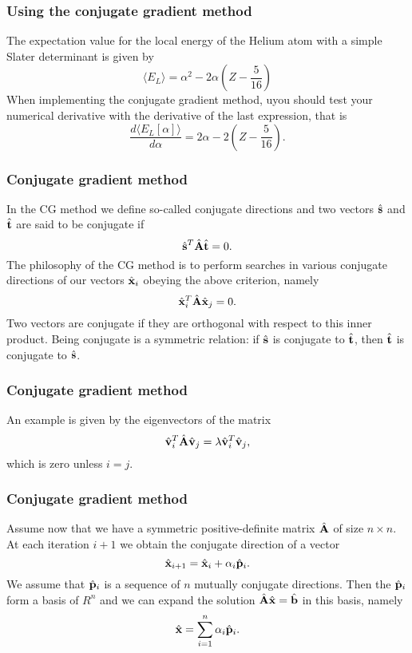 \documentclass[compress]{beamer}
\begin{document}
\frame
{
  \frametitle{Using the conjugate gradient method}
\begin{small}
{\scriptsize
The expectation value for the local energy of the Helium atom with a simple Slater determinant is given by
\[
\langle E_{L} \rangle = \alpha^2-2\alpha\left(Z-\frac{5}{16}\right)
\]
When implementing the conjugate gradient method, uyou should test your numerical derivative with the derivative of the last expression, that is
\[
\frac{d\langle E_{L}[\alpha] \rangle}{d\alpha} = 2\alpha-2\left(Z-\frac{5}{16}\right).
\]
}
\end{small}
}

\frame
{
  \frametitle{Conjugate gradient method}
\begin{small}
{\scriptsize
In the CG method we define so-called conjugate directions and two vectors 
$\hat{\bf {s}}$ and $\hat{\bf {t}}$
are said to be
conjugate if 
\[
\hat{\bf {s}}^T\hat{{\bf A}}\hat{\bf {t}}= 0.
\]
The philosophy of the CG method is to perform searches in various conjugate directions
of our vectors $\hat{{\bf x}}_i$ obeying the above criterion, namely
\[
\hat{\bf {x}}_i^T\hat{{\bf A}}\hat{\bf {x}}_j= 0.
\]
Two vectors are conjugate if they are orthogonal with respect to 
this inner product. Being conjugate is a symmetric relation: if $\hat{\bf {s}}$ is conjugate to $\hat{\bf {t}}$, then $\hat{\bf {t}}$ is conjugate to $\hat{\bf {s}}$.
}
\end{small}
}


\frame
{
  \frametitle{Conjugate gradient method}
\begin{small}
{\scriptsize
An example is given by the eigenvectors of the matrix 
\[
\hat{\bf {v}}_i^T\hat{{\bf A}}\hat{\bf {v}}_j= \lambda\hat{\bf {v}}_i^T\hat{\bf {v}}_j,
\]
which is zero unless $i=j$. 

}
\end{small}
}


\frame
{
  \frametitle{Conjugate gradient method}
\begin{small}
{\scriptsize
Assume now that we have a symmetric positive-definite matrix $\hat{\bf {A}}$ of size
$n\times n$. At each iteration $i+1$ we obtain the conjugate direction of a vector 
\[
\hat{\bf {x}}_{i+1}=\hat{\bf {x}}_{i}+\alpha_i\hat{\bf {p}}_{i}. 
\]
We assume that $\hat{\bf {p}}_{i}$ is a sequence of $n$ mutually conjugate directions. 
Then the $\hat{\bf {p}}_{i}$  form a basis of $R^n$ and we can expand the solution 
$  \hat{{\bf A}}\hat{\bf {x}} = \hat{\bf {b}}$ in this basis, namely
\[
  \hat{\bf {x}}  = \sum^{n}_{i=1} \alpha_i \hat{\bf {p}}_i.
\]
}
\end{small}
}
\end{document}
